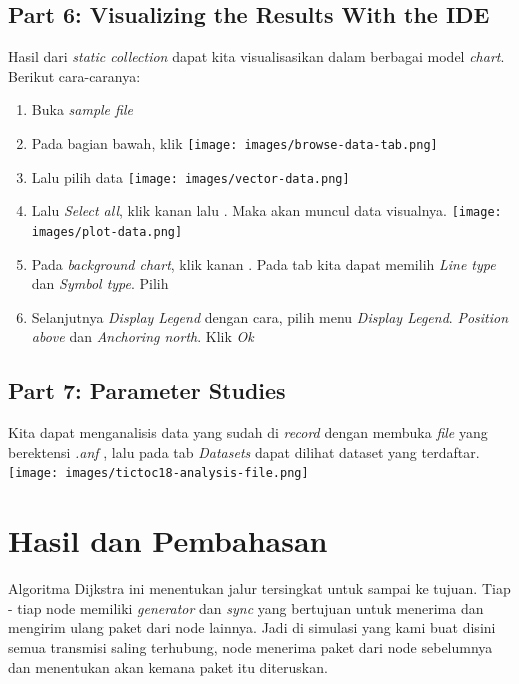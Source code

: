 \documentclass[conference]{IEEEtran}
\begin{document}
\subsection{Part 6: Visualizing the Results With the IDE}
Hasil dari \textit{static collection} dapat kita visualisasikan dalam berbagai model \textit{chart}. Berikut cara-caranya:
\begin{enumerate}
	\item Buka \textit{sample file} 
	\item Pada bagian bawah, klik 
	      \texttt{[image: images/browse-data-tab.png]}
	      \newpage
	\item Lalu pilih  data
	      \texttt{[image: images/vector-data.png]}
	\item Lalu \textit{Select all}, klik kanan lalu . Maka akan muncul data visualnya.
	      \texttt{[image: images/plot-data.png]}

	\item Pada \textit{background chart}, klik kanan . Pada tab  kita dapat memilih \textit{Line type} dan \textit{Symbol type}. Pilih 
	\item Selanjutnya \textit{Display Legend} dengan cara, pilih menu  \textit{Display Legend}. \textit{Position above} dan \textit{Anchoring north}. Klik \textit{Ok}
\end{enumerate}

\subsection{Part 7: Parameter Studies}
Kita dapat menganalisis data yang sudah di \textit{record} dengan membuka \textit{file} yang berektensi \textit{.anf} , lalu pada tab \textit{Datasets} dapat dilihat dataset yang terdaftar.
\texttt{[image: images/tictoc18-analysis-file.png]}

\section{Hasil dan Pembahasan}
Algoritma Dijkstra ini menentukan jalur tersingkat untuk sampai ke tujuan. Tiap - tiap node memiliki \textit{generator} dan \textit{sync} yang bertujuan untuk menerima dan mengirim ulang paket dari node lainnya. Jadi di simulasi yang kami buat disini semua transmisi saling terhubung, node menerima paket dari node sebelumnya dan menentukan akan kemana paket itu diteruskan. 
\end{document}
